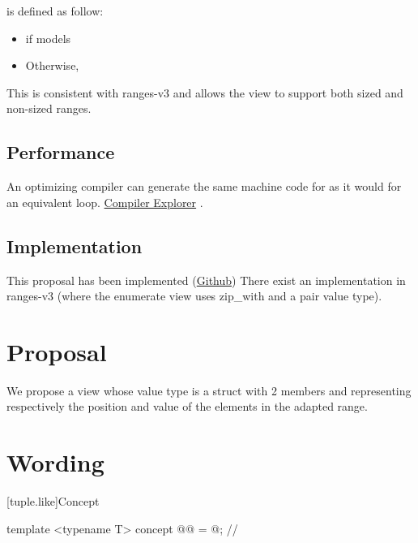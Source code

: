 \documentclass{wg21}
\begin{document}
 is defined as follow:
\begin{itemize}
    \item {} if  models 
    \item Otherwise, 
\end{itemize}

This is consistent with ranges-v3 and allows the view to support both sized and non-sized ranges.


\subsection{Performance}

An optimizing compiler can generate the same machine code for  as it would for an equivalent  loop.  \href{https://godbolt.org/z/2Kxo8d}{Compiler Explorer} .


\subsection{Implementation}

This proposal has been implemented (\href{https://github.com/cor3ntin/rangesnext/blob/master/include/cor3ntin/rangesnext/enumerate.hpp}{Github})
There exist an implementation in ranges-v3 (where the enumerate view uses zip_with and a pair value type).

\section{Proposal}

We propose a view  whose value type is a struct with 2 members  and 
representing respectively the position and value of the elements in the adapted range.

\section{Wording}





[tuple.like]{Concept }

{}%
\begin{itemdecl}
    template <typename T>
    concept @@ = @\seebelownc@;           // \expos
\end{itemdecl}
\end{document}
